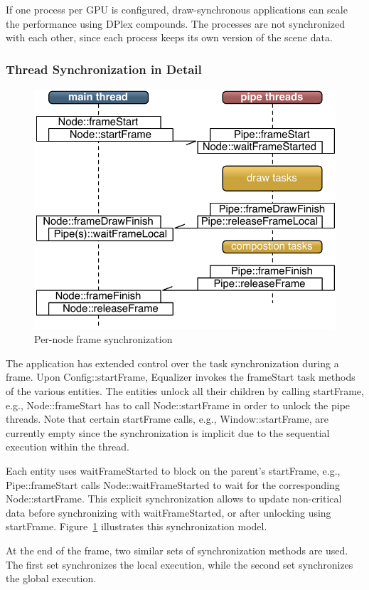 \documentclass[10pt,a4]{scrartcl}
\newcommand{\fig}[1]{Figure~\ref{#1}}
\begin{document}
If one process per GPU is configured, draw-synchronous applications can
scale the performance using DPlex compounds. The processes are not
synchronized with each other, since each process keeps its own version
of the scene data.


\subsubsection{Thread Synchronization in Detail}

\begin{figure}
  \includegraphics[width=.618\textwidth]{images/frameSync.pdf}
  {\caption{\label{fFrameSync}Per-node frame synchronization}}
\end{figure}
The application has extended control over the task synchronization
during a frame. Upon \textsf{Config::startFrame}, Equalizer invokes the
\textsf{frameStart} task methods of the various entities. The entities
unlock all their children by calling \textsf{startFrame}, e.g.,
\textsf{Node::frameStart} has to call \textsf{Node::startFrame} in order
to unlock the pipe threads. Note that certain \textsf{startFrame} calls,
e.g., \textsf{Window::startFrame}, are currently empty since the
synchronization is implicit due to the sequential execution within the
thread.

Each entity uses \textsf{waitFrame\-Started} to block on the parent's
\textsf{startFrame}, e.g., \textsf{Pipe::\-frame\-Start} calls
\textsf{Node::wait\-Frame\-Started} to wait for the corresponding
\textsf{Node::start\-Fra\-me}. This explicit synchronization allows to
update non-critical data before synchronizing with
\textsf{waitFrameStarted}, or after unlocking using
\textsf{start\-Fra\-me}. \fig{fFrameSync} illustrates this
synchronization model.

At the end of the frame, two similar sets of synchronization methods are
used. The first set synchronizes the local execution, while the second
set synchronizes the global execution.
\end{document}
